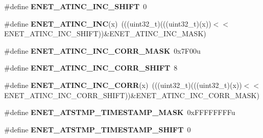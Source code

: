 \begin{DoxyCompactItemize}
\item 
\#define {\bfseries E\+N\+E\+T\+\_\+\+A\+T\+I\+N\+C\+\_\+\+I\+N\+C\+\_\+\+S\+H\+I\+FT}~0\hypertarget{group__ENET__Register__Masks_ga876ed9c5bafbfc5e251c600dc3b1af58}{}\label{group__ENET__Register__Masks_ga876ed9c5bafbfc5e251c600dc3b1af58}

\item 
\#define {\bfseries E\+N\+E\+T\+\_\+\+A\+T\+I\+N\+C\+\_\+\+I\+NC}(x)~(((uint32\+\_\+t)(((uint32\+\_\+t)(x))$<$$<$E\+N\+E\+T\+\_\+\+A\+T\+I\+N\+C\+\_\+\+I\+N\+C\+\_\+\+S\+H\+I\+FT))\&E\+N\+E\+T\+\_\+\+A\+T\+I\+N\+C\+\_\+\+I\+N\+C\+\_\+\+M\+A\+SK)\hypertarget{group__ENET__Register__Masks_ga8d15793d8ec37eb9f5c397303276da52}{}\label{group__ENET__Register__Masks_ga8d15793d8ec37eb9f5c397303276da52}

\item 
\#define {\bfseries E\+N\+E\+T\+\_\+\+A\+T\+I\+N\+C\+\_\+\+I\+N\+C\+\_\+\+C\+O\+R\+R\+\_\+\+M\+A\+SK}~0x7\+F00u\hypertarget{group__ENET__Register__Masks_gad06628842cadf9dd5423d8bc31c32745}{}\label{group__ENET__Register__Masks_gad06628842cadf9dd5423d8bc31c32745}

\item 
\#define {\bfseries E\+N\+E\+T\+\_\+\+A\+T\+I\+N\+C\+\_\+\+I\+N\+C\+\_\+\+C\+O\+R\+R\+\_\+\+S\+H\+I\+FT}~8\hypertarget{group__ENET__Register__Masks_ga804dc6e92567b82a7f104c250841d03d}{}\label{group__ENET__Register__Masks_ga804dc6e92567b82a7f104c250841d03d}

\item 
\#define {\bfseries E\+N\+E\+T\+\_\+\+A\+T\+I\+N\+C\+\_\+\+I\+N\+C\+\_\+\+C\+O\+RR}(x)~(((uint32\+\_\+t)(((uint32\+\_\+t)(x))$<$$<$E\+N\+E\+T\+\_\+\+A\+T\+I\+N\+C\+\_\+\+I\+N\+C\+\_\+\+C\+O\+R\+R\+\_\+\+S\+H\+I\+FT))\&E\+N\+E\+T\+\_\+\+A\+T\+I\+N\+C\+\_\+\+I\+N\+C\+\_\+\+C\+O\+R\+R\+\_\+\+M\+A\+SK)\hypertarget{group__ENET__Register__Masks_gab460295776472a46a57f683ee98f1928}{}\label{group__ENET__Register__Masks_gab460295776472a46a57f683ee98f1928}

\item 
\#define {\bfseries E\+N\+E\+T\+\_\+\+A\+T\+S\+T\+M\+P\+\_\+\+T\+I\+M\+E\+S\+T\+A\+M\+P\+\_\+\+M\+A\+SK}~0x\+F\+F\+F\+F\+F\+F\+F\+Fu\hypertarget{group__ENET__Register__Masks_gaed2e3431a926b017dc138606295ff909}{}\label{group__ENET__Register__Masks_gaed2e3431a926b017dc138606295ff909}

\item 
\#define {\bfseries E\+N\+E\+T\+\_\+\+A\+T\+S\+T\+M\+P\+\_\+\+T\+I\+M\+E\+S\+T\+A\+M\+P\+\_\+\+S\+H\+I\+FT}~0\hypertarget{group__ENET__Register__Masks_ga32c08f5d3821f0f0ff1f40b4ec0de035}{}\label{group__ENET__Register__Masks_ga32c08f5d3821f0f0ff1f40b4ec0de035}


\end{DoxyCompactItemize}
